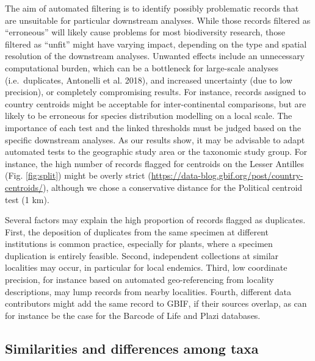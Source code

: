 \documentclass[fleqn,10pt,lineno]{wlpeerj} %
\begin{document}
The aim of automated filtering is to identify possibly problematic records that are unsuitable for particular downstream analyses. While those records filtered as ``erroneous'' will likely cause problems for most biodiversity research, those filtered as ``unfit'' might have varying impact, depending on the type and spatial resolution of the downstream analyses. Unwanted effects include an unnecessary computational burden, which can be a bottleneck for large-scale analyses (i.e.~duplicates, Antonelli et al. 2018), and increased uncertainty (due to low precision), or completely compromising results. For instance, records assigned to country centroids might be acceptable for inter-continental comparisons, but are likely to be erroneous for species distribution modelling on a local scale. The importance of each test and the linked thresholds must be judged based on the specific downstream analyses. As our results show, it may be advisable to adapt automated tests to the geographic study area or the taxonomic study group. For instance, the high number of records flagged for centroids on the Lesser Antilles (Fig. \ref{fig:split}) might be overly strict (\url{https://data-blog.gbif.org/post/country-centroids/}), although we chose a conservative distance for the Political centroid test (1 km).

Several factors may explain the high proportion of records flagged as duplicates. First, the deposition of duplicates from the same specimen at different institutions is common practice, especially for plants, where a specimen duplication is entirely feasible. Second, independent collections at similar localities may occur, in particular for local endemics. Third, low coordinate precision, for instance based on automated geo-referencing from locality descriptions, may lump records from nearby localities. Fourth, different data contributors might add the same record to GBIF, if their sources overlap, as can for instance be the case for the Barcode of Life and Plazi databases.

\hypertarget{similarities-and-differences-among-taxa}{%
\subsection*{Similarities and differences among taxa}\label{similarities-and-differences-among-taxa}}
\end{document}
